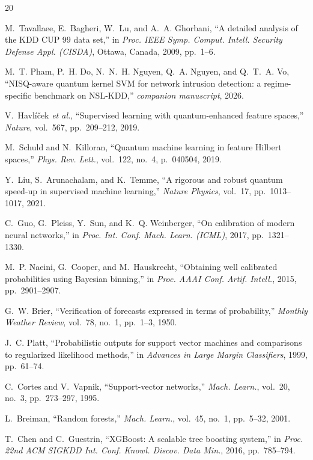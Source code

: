 \documentclass[journal]{IEEEtran}
\begin{document}
\begin{thebibliography}{20}

M.~Tavallaee, E.~Bagheri, W.~Lu, and A.~A. Ghorbani,
``A detailed analysis of the KDD CUP 99 data set,'' in
\emph{Proc. IEEE Symp. Comput. Intell. Security Defense Appl. (CISDA)},
Ottawa, Canada, 2009, pp.~1--6.

M.~T. Pham, P.~H. Do, N.~N.~H. Nguyen, Q.~A. Nguyen, and Q.~T.~A. Vo,
``NISQ-aware quantum kernel SVM for network intrusion detection: a
  regime-specific benchmark on NSL-KDD,'' \emph{companion manuscript},
  2026.

V.~Havl\'i\v{c}ek \emph{et al.},
``Supervised learning with quantum-enhanced feature spaces,''
\emph{Nature}, vol.~567, pp.~209--212, 2019.

M.~Schuld and N.~Killoran,
``Quantum machine learning in feature Hilbert spaces,''
\emph{Phys. Rev. Lett.}, vol.~122, no.~4, p.~040504, 2019.

Y.~Liu, S.~Arunachalam, and K.~Temme,
``A rigorous and robust quantum speed-up in supervised machine
  learning,'' \emph{Nature Physics}, vol.~17, pp.~1013--1017, 2021.

C.~Guo, G.~Pleiss, Y.~Sun, and K.~Q. Weinberger,
``On calibration of modern neural networks,'' in
\emph{Proc. Int. Conf. Mach. Learn. (ICML)}, 2017, pp.~1321--1330.

M.~P. Naeini, G.~Cooper, and M.~Hauskrecht,
``Obtaining well calibrated probabilities using Bayesian binning,''
in \emph{Proc. AAAI Conf. Artif. Intell.}, 2015, pp.~2901--2907.

G.~W. Brier,
``Verification of forecasts expressed in terms of probability,''
\emph{Monthly Weather Review}, vol.~78, no.~1, pp.~1--3, 1950.

J.~C. Platt,
``Probabilistic outputs for support vector machines and comparisons
  to regularized likelihood methods,'' in
\emph{Advances in Large Margin Classifiers}, 1999, pp.~61--74.

C.~Cortes and V.~Vapnik, ``Support-vector networks,''
\emph{Mach. Learn.}, vol.~20, no.~3, pp.~273--297, 1995.

L.~Breiman, ``Random forests,'' \emph{Mach. Learn.}, vol.~45, no.~1,
pp.~5--32, 2001.

T.~Chen and C.~Guestrin,
``XGBoost: A scalable tree boosting system,'' in
\emph{Proc. 22nd ACM SIGKDD Int. Conf. Knowl. Discov. Data Min.},
2016, pp.~785--794.


\end{thebibliography}
\end{document}

